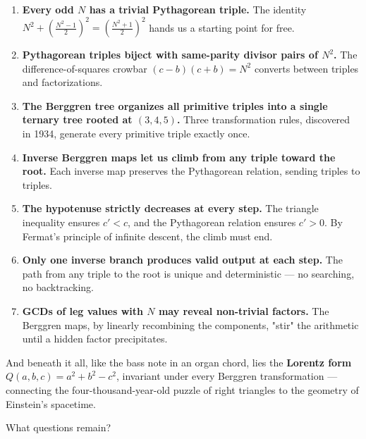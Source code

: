 \documentclass[11pt,twoside,openright]{book}
\theoremstyle{definition}
\theoremstyle{remark}
\begin{document}
\begin{enumerate}
  \item \textbf{Every odd $N$ has a trivial Pythagorean triple.} The identity $N^2 + \left(\frac{N^2-1}{2}\right)^2 = \left(\frac{N^2+1}{2}\right)^2$ hands us a starting point for free.

  \item \textbf{Pythagorean triples biject with same-parity divisor pairs of $N^2$.} The difference-of-squares crowbar $(c-b)(c+b) = N^2$ converts between triples and factorizations.

  \item \textbf{The Berggren tree organizes all primitive triples into a single ternary tree rooted at $(3,4,5)$.} Three transformation rules, discovered in 1934, generate every primitive triple exactly once.

  \item \textbf{Inverse Berggren maps let us climb from any triple toward the root.} Each inverse map preserves the Pythagorean relation, sending triples to triples.

  \item \textbf{The hypotenuse strictly decreases at every step.} The triangle inequality ensures $c' < c$, and the Pythagorean relation ensures $c' > 0$. By Fermat's principle of infinite descent, the climb must end.

  \item \textbf{Only one inverse branch produces valid output at each step.} The path from any triple to the root is unique and deterministic --- no searching, no backtracking.

  \item \textbf{GCDs of leg values with $N$ may reveal non-trivial factors.} The Berggren maps, by linearly recombining the components, "stir" the arithmetic until a hidden factor precipitates.
\end{enumerate}

And beneath it all, like the bass note in an organ chord, lies the \textbf{Lorentz form} $Q(a,b,c) = a^2 + b^2 - c^2$, invariant under every Berggren transformation --- connecting the four-thousand-year-old puzzle of right triangles to the geometry of Einstein's spacetime.

What questions remain?
\end{document}
